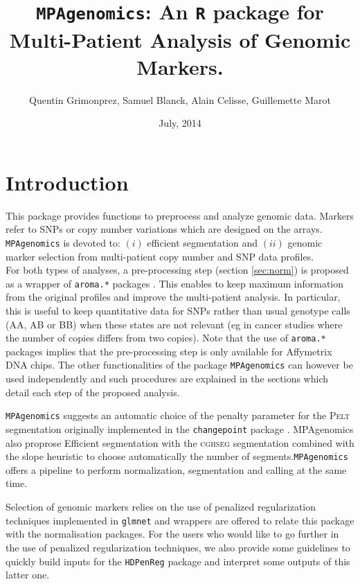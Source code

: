 \documentclass[a4paper,10pt]{article}
\title{ \texttt{MPAgenomics}: An \texttt{R} package for Multi-Patient Analysis of Genomic Markers.}
\author{Quentin Grimonprez, Samuel Blanck, Alain Celisse, Guillemette Marot}
\date{July, 2014}
\begin{document}

\maketitle

\tableofcontents


\section{Introduction}
		This package provides functions to preprocess and analyze genomic data. Markers refer to SNPs or copy number variations which are designed on the arrays. 
    \texttt{MPAgenomics} is devoted to: $(i)$ efficient segmentation and $(ii)$ genomic marker selection from multi-patient copy number and SNP data profiles.\\
    
    For both types of analyses, a pre-processing step (section \ref{sec:norm}) is proposed as a wrapper of \texttt{aroma.*} packages \cite{aroma}\cite{affy}\cite{aromasite}. 
		This enables to keep maximum information from the original profiles and improve the multi-patient analysis. In particular, this is useful to keep quantitative data for SNPs rather than usual genotype calls (AA, AB or BB) when these states are not relevant (eg in cancer studies where the number of copies differs from two copies). Note that the use of \texttt{aroma.*} packages \cite{aroma} implies that the pre-processing step is only available for Affymetrix DNA chips. The other functionalities of the package \texttt{MPAgenomics} can however be used independently and such procedures are explained in the sections which detail each step of the proposed analysis. 
    
    \texttt{MPAgenomics} suggests an automatic choice of the penalty parameter for the \textsc{Pelt} segmentation \cite{pelt} originally implemented in the \texttt{changepoint} package \cite{peltR}. MPAgenomics also proprose Efficient segmentation with the \textsc{cghseg} segmentation \cite{cghseg}\cite{cghsegb} combined with the slope heuristic \cite{heurpente} to choose automatically the number of segments.\texttt{MPAgenomics} offers a pipeline to perform normalization, segmentation and calling at the same time.
    
    Selection of genomic markers relies on the use of penalized regularization techniques implemented in \texttt{glmnet} \cite{glmnet} and wrappers are offered to relate this package with the normalisation packages. For the users who would like to go further in the use of penalized regularization techniques, we also provide some guidelines to quickly build inputs for the \texttt{HDPenReg} package and interpret some outputs of this latter one.
\end{document}
